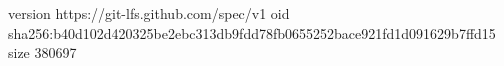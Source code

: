 version https://git-lfs.github.com/spec/v1
oid sha256:b40d102d420325be2ebc313db9fdd78fb0655252bace921fd1d091629b7ffd15
size 380697
